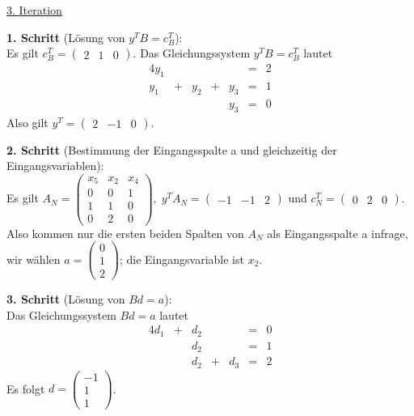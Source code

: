 \documentclass[10pt,a4paper,oneside,ngerman,numbers=noenddot]{scrartcl}
\begin{document}
		\underline{3. Iteration}
		
		\textbf{1. Schritt} (Lösung von $y^{T}B = c_{B}^{T}$):\\
		Es gilt $c_{B}^{T} = \begin{pmatrix} 2 & 1 & 0 \end{pmatrix}$. Das Gleichungssystem $y^{T}B = c_{B}^{T}$ lautet
		\begin{alignat*}{4}
			y_{1} && && &=& 2 \\
			y_{1} &+& y_{2} &+& y_{3} &=& 1 \\
			&& && y_{3} &=& 0
		\end{alignat*}
		Also gilt $y^{T} = \begin{pmatrix} 2 & -1 & 0 \end{pmatrix}$.
		
		\textbf{2. Schritt} (Bestimmung der Eingangsspalte a und gleichzeitig der Eingangsvariablen):\\
		Es gilt $A_{N} = \begin{pmatrix} x_{5} & x_{2} & x_{4} \\ 0 & 0 & 1 \\ 1 & 1 & 0 \\ 0 & 2 & 0 \end{pmatrix},\; y^{T}A_{N} = \begin{pmatrix} -1 & -1 & 2 \end{pmatrix}$ und $c_{N}^{T} = \begin{pmatrix} 0 & 2 & 0\end{pmatrix}$. Also kommen nur die ersten beiden Spalten von $A_{N}$ als Eingangsspalte a infrage, wir wählen $a = \begin{pmatrix} 0 \\ 1 \\ 2 \end{pmatrix}$; die Eingangsvariable ist $x_{2}$.
		
		\textbf{3. Schritt} (Lösung von $Bd = a$):\\
		Das Gleichungssystem $Bd = a$ lautet
		\begin{alignat*}{4}
			d_{1} &+& d_{2} && &=& 0\\
			&& d_{2} && &=& 1 \\
			&& d_{2} &+& d_{3} &=& 2
		\end{alignat*}
		Es folgt $d = \begin{pmatrix} -1 \\ 1 \\ 1 \end{pmatrix}$.
		
\end{document}
